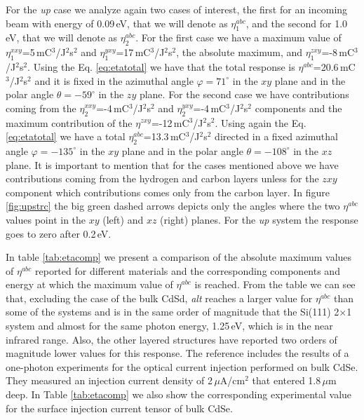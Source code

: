 \documentclass[pss]{wiley2sp} %
\begin{document}
For the \emph{up} case we analyze again two cases of interest, the first for an incoming beam with energy of 0.09\,eV, that we will denote as $\eta^{abc}_{1}$, and the second for 1.0\,eV, that we will denote as $\eta^{abc}_{2}$. For the first case we have a maximum value of $\eta^{xxy}_{1}$=5\,mC$^{3}$/J$^{2}$s$^{2}$ and $\eta^{yxy}_{1}$=17\,mC$^{3}$/J$^{2}$s$^{2}$, the absolute maximum, and $\eta^{zxy}_{1}$=-8\,mC$^{3}$/J$^{2}$s$^{2}$. Using the Eq. \ref{eq:etatotal} we have that the total response is $\eta^{abc}$=20.6\,mC$^{3}$/J$^{2}$s$^{2}$ and it is fixed in the azimuthal angle $\varphi=71^{\circ}$ in the $xy$ plane and in the polar angle $\theta=-59^{\circ}$ in the $zy$ plane. For the second case we have contributions coming from the $\eta^{xxy}_{2}$=-4\,mC$^{3}$/J$^{2}$s$^{2}$ and $\eta^{yxy}_{2}$=-4\,mC$^{3}$/J$^{2}$s$^{2}$ components and the maximum contribution of the $\eta^{zxy}$=-12\,mC$^{3}$/J$^{2}$s$^{2}$. Using again the Eq. \eqref{eq:etatotal} we have a total $\eta^{abc}_{2}$=13.3\,mC$^{3}$/J$^{2}$s$^{2}$ directed in a fixed azimuthal angle $\varphi=-135^{\circ}$ in the $xy$ plane and in the polar angle $\theta=-108^{\circ}$ in the $xz$ plane. It is important to mention that for the cases mentioned above we have contributions coming from the hydrogen and carbon layers unless for the $zxy$ component which contributions comes only from the carbon layer. In figure \ref{fig:upstrc} the big green dashed arrows depicts only the angles where the two $\eta^{abc}$ values point in the $xy$ (left) and $xz$ (right) planes. For the \emph{up} system the response goes to zero after 0.2\,eV. 

In table \ref{tab:etacomp} we present a comparison of the absolute maximum values of $\eta^{abc}$ reported for different materials and the corresponding components and energy at which the maximum value of $\eta^{abc}$ is reached. From the table we can see that, excluding the case of the bulk CdSd, \emph{alt} reaches a larger value for $\eta^{abc}$ than some of the systems and is in the same order of magnitude that the Si(111) 2$\times$1 system and almost for the same photon energy, 1.25\,eV, which is in the near infrared range. Also, the other layered structures have reported two orders of magnitude lower values for this response. The reference \cite{lamanAPL99} includes the results of a one-photon experiments for the optical current injection performed on bulk CdSe. They measured an injection current density of 2\,$\mu$A/cm$^{2}$ that entered 1.8\,$\mu$m deep. In Table \ref{tab:etacomp} we also show the corresponding experimental value for the surface injection current tensor of bulk CdSe.
\end{document}
